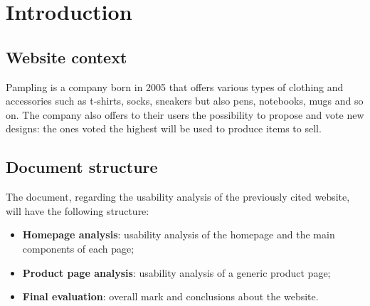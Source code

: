\section{Introduction}

\subsection{Website context}
Pampling is a company born in 2005 that offers various types of clothing and accessories such as t-shirts, socks, sneakers but also pens, notebooks, mugs and so on. 
The company also offers to their users the possibility to propose and vote new designs: the ones voted the highest will be used to produce items to sell.

\subsection{Document structure}
The document, regarding the usability analysis of the previously cited website, will have the following structure:
\begin{itemize}
\item \textbf{Homepage analysis}: usability analysis of the homepage and the main components of each page;
\item \textbf{Product page analysis}: usability analysis of a generic product page;
\item \textbf{Final evaluation}: overall mark and conclusions about the website.
\end{itemize}



